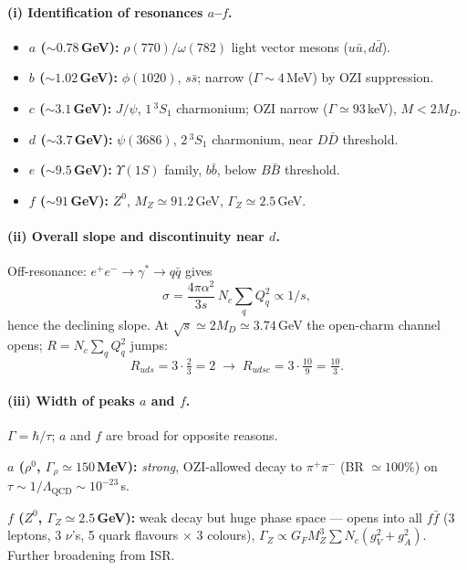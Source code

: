\documentclass[11pt]{article}
\begin{document}
\paragraph{(i) Identification of resonances $a$--$f$.}
\begin{itemize}
\item \textbf{$a$ ($\sim 0.78$\,GeV):} $\rho(770)/\omega(782)$ light vector mesons ($u\bar u,d\bar d$).
\item \textbf{$b$ ($\sim 1.02$\,GeV):} $\phi(1020)$, $s\bar s$; narrow ($\Gamma\sim 4$\,MeV) by OZI suppression.
\item \textbf{$c$ ($\sim 3.1$\,GeV):} $J/\psi$, $1\,^3S_1$ charmonium; OZI narrow ($\Gamma\simeq 93$\,keV), $M<2M_D$.
\item \textbf{$d$ ($\sim 3.7$\,GeV):} $\psi(3686)$, $2\,^3S_1$ charmonium, near $D\bar D$ threshold.
\item \textbf{$e$ ($\sim 9.5$\,GeV):} $\Upsilon(1S)$ family, $b\bar b$, below $B\bar B$ threshold.
\item \textbf{$f$ ($\sim 91$\,GeV):} $Z^0$, $M_Z\simeq 91.2$\,GeV, $\Gamma_Z\simeq 2.5$\,GeV.
\end{itemize}

\paragraph{(ii) Overall slope and discontinuity near $d$.}
Off-resonance: $e^+e^-\to\gamma^*\to q\bar q$ gives
\[
\sigma=\frac{4\pi\alpha^2}{3 s}\,N_c\sum_q Q_q^2 \propto 1/s,
\]
hence the declining slope. At $\sqrt s\simeq 2M_D\simeq 3.74$\,GeV the open-charm channel opens; $R=N_c\sum_q Q_q^2$ jumps:
\[
R_{uds}=3\cdot\tfrac{2}{3}=2\;\longrightarrow\; R_{udsc}=3\cdot\tfrac{10}{9}=\tfrac{10}{3}.
\]

\paragraph{(iii) Width of peaks $a$ and $f$.}
$\Gamma=\hbar/\tau$; $a$ and $f$ are broad for opposite reasons.

\textbf{$a$ ($\rho^0$, $\Gamma_\rho\simeq 150$\,MeV):} \emph{strong}, OZI-allowed decay to $\pi^+\pi^-$ (BR $\simeq 100\%$) on $\tau\sim 1/\Lambda_\mathrm{QCD}\sim 10^{-23}$\,s.

\textbf{$f$ ($Z^0$, $\Gamma_Z\simeq 2.5$\,GeV):} weak decay but huge phase space — opens into all $f\bar f$ (3 leptons, 3 $\nu$'s, 5 quark flavours $\times$ 3 colours), $\Gamma_Z\propto G_F M_Z^3\sum N_c(g_V^2+g_A^2)$. Further broadening from ISR.
\end{document}
